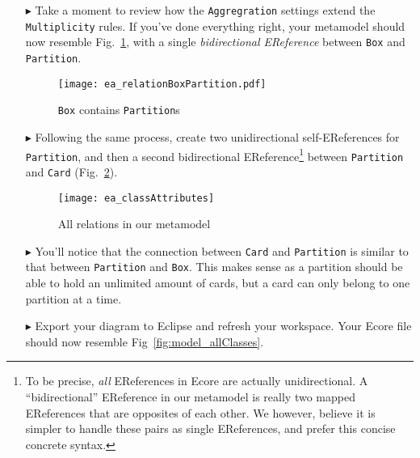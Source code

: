 \begin{itemize}
\item[$\blacktriangleright$] Take a moment to review how the \texttt{Aggregration} settings extend the \texttt{Multiplicity} rules. If you've done everything
right, your metamodel should now resemble Fig.~\ref{fig:ereference_completed}, with a single \emph{bidirectional EReference} between \texttt{Box} and
\texttt{Partition}.

\vspace{1cm}

\begin{figure}[htbp]
	\centering
  \texttt{[image: ea\_relationBoxPartition.pdf]}
	\caption{\texttt{Box} contains \texttt{Partition}s}
	\label{fig:ereference_completed}
\end{figure}
\FloatBarrier

\item[$\blacktriangleright$] Following the same process, create two unidirectional self-EReferences for \texttt{Partition}, and then a second bidirectional
EReference\footnote{To be precise, \emph{all} EReferences in Ecore are actually unidirectional. A ``bidirectional'' EReference in our metamodel is really two
mapped EReferences that are opposites of each other. We however, believe it is simpler to handle these pairs as single EReferences, and prefer this
concise concrete syntax.} between \texttt{Partition} and \texttt{Card} (Fig.~\ref{fig:ereferences_all}). 

\vspace{1cm}

\begin{figure}[htbp]
	\centering
  \texttt{[image: ea\_classAttributes]}
	\caption{All relations in our metamodel}
	\label{fig:ereferences_all}
\end{figure}
\FloatBarrier

\vspace{1cm}

\item[$\blacktriangleright$] You'll notice that the connection between \texttt{Card} and \texttt{Partition} is similar to that between \texttt{Partition} and
\texttt{Box}. This makes sense as a partition should be able to hold an unlimited amount of cards, but a card can only belong to one partition at a time.

\vspace{1cm}

\item[$\blacktriangleright$] Export your diagram to Eclipse and refresh your workspace. Your Ecore file should now resemble Fig~\ref{fig:model_allClasses}.


\end{itemize}

